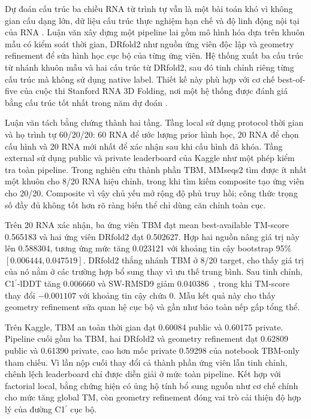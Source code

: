 \documentclass[12pt,a4paper,oneside]{report}
\newcommand{\cprime}{C1$^{\prime}$}
\newcommand{\angstrom}{\text{\AA}}
\begin{document}
Dự đoán cấu trúc ba chiều RNA từ trình tự vẫn là một bài toán khó vì không gian cấu
dạng lớn, dữ liệu cấu trúc thực nghiệm hạn chế và độ linh động nội tại của RNA
\cite{zhang_experimental_review,rna_progress_review,state_of_rnart}. Luận văn xây dựng
một pipeline lai gồm mô hình hóa dựa trên khuôn mẫu có kiểm soát thời gian, DRfold2 như
nguồn ứng viên độc lập và geometry refinement để sửa hình học cục bộ của từng ứng viên.
Hệ thống xuất ba cấu trúc từ nhánh khuôn mẫu và hai cấu trúc từ DRfold2, sau đó tinh
chỉnh riêng từng cấu trúc mà không sử dụng native label. Thiết kế này phù hợp với cơ chế
best-of-five của cuộc thi Stanford RNA 3D Folding, nơi một hệ thống được đánh giá bằng
cấu trúc tốt nhất trong năm dự đoán \cite{competition_paper,kaggle_competition}.

Luận văn tách bằng chứng thành hai tầng. Tầng local sử dụng protocol thời gian và họ
trình tự 60/20/20: 60 RNA để ước lượng prior hình học, 20 RNA để chọn cấu hình và 20 RNA
mới nhất để xác nhận sau khi cấu hình đã khóa. Tầng external sử dụng public và private
leaderboard của Kaggle như một phép kiểm tra toàn pipeline. Trong nghiên cứu thành phần
TBM, MMseqs2 tìm được ít nhất một khuôn cho 8/20 RNA hiệu chỉnh, trong khi tìm kiếm
composite tạo ứng viên cho 20/20. Composite vì vậy chủ yếu mở rộng độ phủ truy hồi;
công thức trọng số đầy đủ không tốt hơn rõ ràng biến thể chỉ dùng căn chỉnh toàn cục.

Trên 20 RNA xác nhận, ba ứng viên TBM đạt mean best-available TM-score 0.565183 và hai
ứng viên DRfold2 đạt 0.502627. Hợp hai nguồn nâng giá trị này lên 0.588304, tương ứng mức
tăng 0.023121 với khoảng tin cậy bootstrap 95\% $[0.006444,0.047519]$. DRfold2 thắng
nhánh TBM ở 8/20 target, cho thấy giá trị của nó nằm ở các trường hợp bổ sung thay vì ưu
thế trung bình. Sau tinh chỉnh, \cprime{}-lDDT tăng 0.006660 và SW-RMSD9 giảm
0.040386~\angstrom{}, trong khi TM-score thay đổi $-0.001107$ với khoảng tin cậy chứa
0. Mẫu kết quả này cho thấy geometry refinement sửa quan hệ cục bộ và gần như bảo toàn
nếp gấp tổng thể.

Trên Kaggle, TBM an toàn thời gian đạt 0.60084 public và 0.60175 private. Pipeline cuối
gồm ba TBM, hai DRfold2 và geometry refinement đạt 0.62809 public và 0.61390 private,
cao hơn mốc private 0.59298 của notebook TBM-only tham chiếu. Vì lần nộp cuối thay đổi cả
thành phần ứng viên lẫn tinh chỉnh, chênh lệch leaderboard chỉ được diễn giải ở mức toàn
pipeline. Kết hợp với factorial local, bằng chứng hiện có ủng hộ tính bổ sung nguồn như
cơ chế chính cho mức tăng global TM, còn geometry refinement đóng vai trò cải thiện độ
hợp lý của đường \cprime{} cục bộ.
\end{document}
